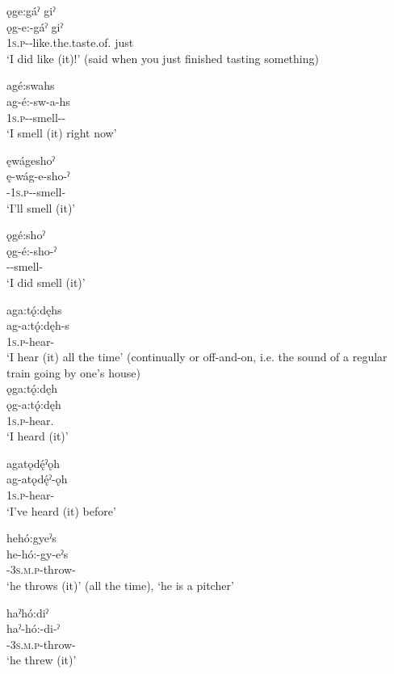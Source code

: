 \ex ǫge:gáˀ giˀ\\
\gll ǫg-e:-gáˀ giˀ\\
 \textsc{1s.p}-{\joinerE}-like.the.taste.of.{\stative} just\\
\glt `I did like (it)!' (said when you just finished tasting something)
\z
\z

\ea\label{ex:3aspswitex11}
\ea agé:swahs\\
\gll ag-é:-sw-a-hs\\
 \textsc{1s.p}-{\joinerE}-smell-{\joinerA}-{\habitual}\\
\glt `I smell (it) right now'


\ex ęwágeshoˀ\\
\gll ę-wág-e-sho-ˀ\\
\fut-\textsc{1s.p}-{\joinerE}-smell-{\punctual}\\
\glt ‘I’ll smell (it)’

\newpage
\ex ǫgé:shoˀ\\
\gll ǫg-é:-sho-ˀ\\
 -{\joinerE}-smell-{\punctual}\\
\glt `I did smell (it)'
\z
\z

\ea\label{ex:3aspswitex12} 
\ea aga:tǫ́:dęhs\\
\gll ag-a:tǫ́:dęh-s\\
\textsc{1s.p}-hear-{\habitual}\\
\glt ‘I hear (it) all the time’ (continually or off-and-on, i.e. the sound of a regular train going by one’s house)\\


\ex ǫga:tǫ́:dęh\\
\gll ǫg-a:tǫ́:dęh\\
\textsc{1s.p}-hear.{\zeropunctual}\\
\glt `I heard (it)'

\ex agatǫdę́ˀǫh\\
\gll ag-atǫdę́ˀ-ǫh\\
\textsc{1s.p}-hear-{\stative}\\
\glt ‘I’ve heard (it) before’
\z
\z

\ea\label{ex:3aspswitex13} 
\ea hehó:gyeˀs \\
\gll he-hó:-gy-eˀs\\
 {\translocative}-\textsc{3s.m.p}-throw-{\habitual}\\
\glt ‘he throws (it)’ (all the time), `he is a pitcher'

\ex haˀhó:diˀ\\
\gll haˀ-hó:-di-ˀ\\
 {\translocative}-\textsc{3s.m.p}-throw-{\punctual}\\
\glt `he threw (it)'

